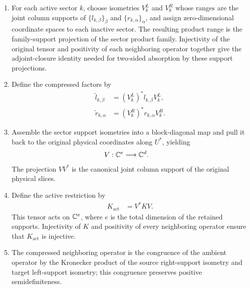 \documentclass{article}
\begin{document}
\begin{enumerate}
    \item For each active sector $k$, choose isometries $V^L_k$ and $V^R_k$
    whose ranges are the joint column supports of $\{l_{k,\beta}\}_\beta$ and
    $\{r_{k,\alpha}\}_\alpha$, and assign zero-dimensional coordinate spaces
    to each inactive sector. The resulting product range is the family-support
    projection of the sector product family. Injectivity of the original
    tensor and positivity of each neighboring operator together give the
    adjoint-closure identity needed for two-sided absorption by these support
    projections.

    \item Define the compressed factors by
    \begin{align}
        \widetilde l_{k,\beta}
            &=
        (V^L_k)^*l_{k,\beta}V^L_k,
        \label{eq:cpsv16_active_physical_support_compression_left_factor}\\
        \widetilde r_{k,\alpha}
            &=
        (V^R_k)^*r_{k,\alpha}V^R_k.
        \label{eq:cpsv16_active_physical_support_compression_right_factor}
    \end{align}

    \item Assemble the sector support isometries into a block-diagonal map
    and pull it back to the original physical coordinates along $U^*$, yielding
    \begin{align}
        V
            &:
        \mathbb{C}^e\longrightarrow\mathbb{C}^d.
        \label{eq:cpsv16_active_physical_support_compression_physical_inclusion}
    \end{align}
    The projection $VV^*$ is the canonical joint column support of the
    original physical slices.

    \item Define the active restriction by
    \begin{align}
        K_{\mathrm{act}}
            &=
        V^*KV.
        \label{eq:cpsv16_active_physical_support_compression_restricted_tensor}
    \end{align}
    This tensor acts on $\mathbb{C}^e$, where $e$ is the total dimension of the retained
    supports. Injectivity of $K$ and positivity of every neighboring operator
    ensure that $K_{\mathrm{act}}$ is injective.

    \item The compressed neighboring operator is the congruence of the
    ambient operator by the Kronecker product of the source right-support
    isometry and target left-support isometry; this congruence preserves
    positive semidefiniteness.


\end{enumerate}
\end{document}
